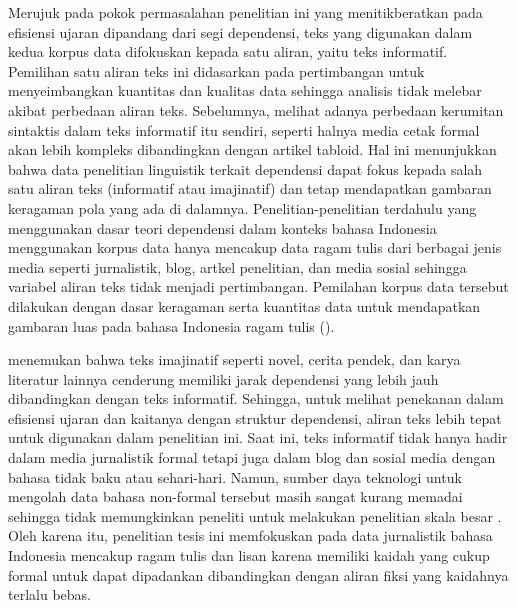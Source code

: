 Merujuk pada pokok permasalahan penelitian ini yang menitikberatkan pada efisiensi ujaran dipandang dari segi dependensi, teks yang digunakan dalam kedua korpus data difokuskan kepada satu aliran, yaitu teks informatif. Pemilihan satu aliran teks ini didasarkan pada pertimbangan untuk menyeimbangkan kuantitas dan kualitas data sehingga analisis tidak melebar akibat perbedaan aliran teks. Sebelumnya, \cite{miller2011critical} melihat adanya perbedaan kerumitan sintaktis dalam teks informatif itu sendiri, seperti halnya media cetak formal akan lebih kompleks dibandingkan dengan artikel tabloid. Hal ini menunjukkan bahwa data penelitian linguistik terkait dependensi dapat fokus kepada salah satu aliran teks (informatif atau imajinatif) dan tetap mendapatkan gambaran keragaman pola yang ada di dalamnya. Penelitian-penelitian terdahulu yang menggunakan dasar teori dependensi dalam konteks bahasa Indonesia menggunakan korpus data hanya mencakup data ragam tulis dari berbagai jenis media seperti jurnalistik, blog, artkel penelitian, dan media sosial sehingga variabel aliran teks tidak menjadi pertimbangan. Pemilahan korpus data tersebut dilakukan dengan dasar keragaman serta kuantitas data untuk mendapatkan gambaran luas pada bahasa Indonesia ragam tulis (\citealp{kamayani2011dependency, green2012indonesian, irmawati2015dependency, futrell2015large}). 

\cite{wang2017effects} menemukan bahwa teks imajinatif seperti novel, cerita pendek, dan karya literatur lainnya cenderung memiliki jarak dependensi yang lebih jauh dibandingkan dengan teks informatif. Sehingga, untuk melihat penekanan dalam efisiensi ujaran dan kaitanya dengan struktur dependensi, aliran teks lebih tepat untuk digunakan dalam penelitian ini. Saat ini, teks informatif tidak hanya hadir dalam media jurnalistik formal tetapi juga dalam blog dan sosial media dengan bahasa tidak baku atau sehari-hari. Namun, sumber daya teknologi untuk mengolah data bahasa non-formal tersebut masih sangat kurang memadai sehingga tidak memungkinkan peneliti untuk melakukan penelitian skala besar \citep{green2012indonesian}. Oleh karena itu, penelitian tesis ini memfokuskan pada data jurnalistik bahasa Indonesia mencakup ragam tulis dan lisan karena memiliki kaidah yang cukup formal untuk dapat dipadankan dibandingkan dengan aliran fiksi yang kaidahnya terlalu bebas. 

